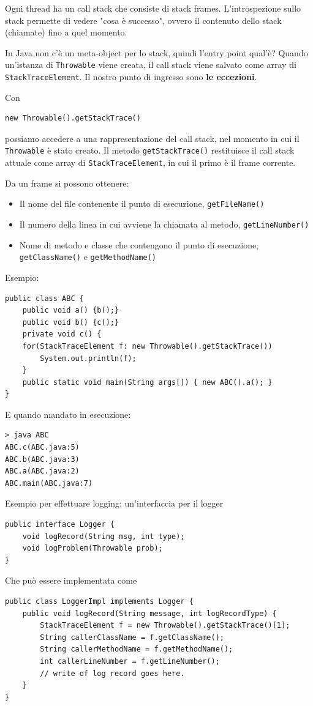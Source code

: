 Ogni thread ha un call stack che consiste di stack frames. L'introspezione sullo stack permette di vedere "cosa è successo", ovvero il contenuto dello stack (chiamate) fino a quel momento.

In Java non c'è un meta-object per lo stack, quindi l'entry point qual'è? Quando un'istanza di \texttt{Throwable} viene creata, il call stack viene salvato come array di \texttt{StackTraceElement}. Il nostro punto di ingresso sono \textbf{le eccezioni}.

Con
\begin{verbatim}
new Throwable().getStackTrace()
\end{verbatim}
possiamo accedere a una rappresentazione del call stack, nel momento in cui il \texttt{Throwable} è stato creato. Il metodo \texttt{getStackTrace()} restituisce il call stack attuale come array di \texttt{StackTraceElement}, in cui il primo è il frame corrente.

Da un frame si possono ottenere:
\begin{itemize}
    \item Il nome del file contenente il punto di esecuzione, \texttt{getFileName()}

    \item Il numero della linea in cui avviene la chiamata al metodo, \texttt{getLineNumber()}

    \item Nome di metodo e classe che contengono il punto di esecuzione, \texttt{getClassName()} e \texttt{getMethodName()}
\end{itemize}

Esempio:
\begin{verbatim}
public class ABC {
    public void a() {b();}
    public void b() {c();}
    private void c() {
    for(StackTraceElement f: new Throwable().getStackTrace())
        System.out.println(f);
    }
    public static void main(String args[]) { new ABC().a(); }
}
\end{verbatim}

E quando mandato in esecuzione:
\begin{verbatim}
> java ABC
ABC.c(ABC.java:5)
ABC.b(ABC.java:3)
ABC.a(ABC.java:2)
ABC.main(ABC.java:7)
\end{verbatim}

Esempio per effettuare logging: un'interfaccia per il logger
\begin{verbatim}
public interface Logger {
    void logRecord(String msg, int type);
    void logProblem(Throwable prob);
}
\end{verbatim}
Che può essere implementata come
\begin{verbatim}
public class LoggerImpl implements Logger {
    public void logRecord(String message, int logRecordType) {
        StackTraceElement f = new Throwable().getStackTrace()[1];
        String callerClassName = f.getClassName();
        String callerMethodName = f.getMethodName();
        int callerLineNumber = f.getLineNumber();
        // write of log record goes here.
    }
}
\end{verbatim}

